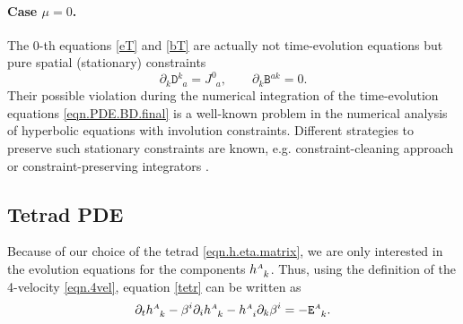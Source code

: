 \documentclass[
10pt, %
a4paper, %
oneside, %
twocolumn,
headinclude,footinclude, %
BCOR5mm, %
]{scrartcl}
\newcommand{\sA}{\mathsmaller A}
\newcommand{\pd}[1]{\partial_{#1}}
\newcommand{\tetrsymbol}{h}
\newcommand{\tetr}[2]{\tetrsymbol^{#1}_{\phantom{#1}#2}}
\newcommand{\aD}[2]{\mathcal{D}_{\phantom{#2}#1}^{#2}}	%
\newcommand{\Dfin}[2]{\mathtt{D}_{\phantom{#2}#1}^{#2}}	%
\newcommand{\Efin}[2]{\mathtt{E}^{#1}_{\phantom{#1}#2}}	%
\newcommand{\Bfin}[2]{\mathtt{B}^{#1#2}}	%
\newcommand{\aU}{\mathcal{U}}%
\newcommand{\NC}[2]{J^{#2}_{\phantom{#2}#1}}
\begin{document}
	
	\paragraph{Case $ \mu = 0 $.} 
	
	The $ 0 $-th equations \eqref{eT} and \eqref{bT} are actually not time-evolution equations but  
	pure spatial (stationary) constraints
	\begin{equation}\label{eqn.div.constr}
		\pd{k} \Dfin{a}{k} = \NC{a}{0}, 
		\qquad
		\pd{k} \Bfin{a}{k} = 0.
	\end{equation}
	Their possible violation during the numerical integration of the time-evolution equations 
	\eqref{eqn.PDE.BD.final} is a well-known problem in the numerical analysis of hyperbolic 
	equations 
	with involution constraints. Different strategies to 
	preserve such stationary constraints   
	are known, e.g. constraint-cleaning approach
	\cite{Munz2000,Dedneretal,Dumbser2019} or constraint-preserving integrators
	\cite{Olivares2022,SIGPR2021,oliynyk2025}.
	
	
	\subsection{Tetrad PDE}
	
	Because of our choice of the tetrad \eqref{eqn.h.eta.matrix}, we are only interested in the  
	evolution equations for the components $ \tetr{\sA}{k} $. Thus, using the definition of 
	the 4-velocity \eqref{eqn.4vel}, equation \eqref{tetr} can be written as
	\begin{equation}\label{eqn.tetr.3+1}
		\pd{t} \tetr{\sA}{k} - \beta^i \pd{i} \tetr{\sA}{k} - \tetr{\sA}{i} \pd{k} \beta^i 
		= 
		-\Efin{\sA}{k}.
	\end{equation}
	
\end{document}
